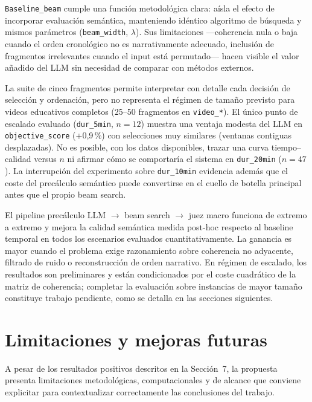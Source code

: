 \documentclass[12pt,a4paper]{article}
\begin{document}
\texttt{Baseline\_beam} cumple una función metodológica clara: aísla el efecto de incorporar evaluación semántica, manteniendo idéntico algoritmo de búsqueda y mismos parámetros (\texttt{beam\_width}, \(\lambda\)). Sus limitaciones ---coherencia nula o baja cuando el orden cronológico no es narrativamente adecuado, inclusión de fragmentos irrelevantes cuando el input está permutado--- hacen visible el valor añadido del LLM sin necesidad de comparar con métodos externos.

La suite de cinco fragmentos permite interpretar con detalle cada decisión de selección y ordenación, pero no representa el régimen de tamaño previsto para videos educativos completos (25--50 fragmentos en \texttt{video\_*}). El único punto de escalado evaluado (\texttt{dur\_5min}, \(n=12\)) muestra una ventaja modesta del LLM en \texttt{objective\_score} (+0{,}9\,\%) con selecciones muy similares (ventanas contiguas desplazadas). No es posible, con los datos disponibles, trazar una curva tiempo--calidad versus \(n\) ni afirmar cómo se comportaría el sistema en \texttt{dur\_20min} (\(n=47\)). La interrupción del experimento sobre \texttt{dur\_10min} evidencia además que el coste del precálculo semántico puede convertirse en el cuello de botella principal antes que el propio beam search.

El pipeline precálculo LLM $\rightarrow$ beam search $\rightarrow$ juez macro funciona de extremo a extremo y mejora la calidad semántica medida post-hoc respecto al baseline temporal en todos los escenarios evaluados cuantitativamente. La ganancia es mayor cuando el problema exige razonamiento sobre coherencia no adyacente, filtrado de ruido o reconstrucción de orden narrativo. En régimen de escalado, los resultados son preliminares y están condicionados por el coste cuadrático de la matriz de coherencia; completar la evaluación sobre instancias de mayor tamaño constituye trabajo pendiente, como se detalla en las secciones siguientes.


\section{Limitaciones y mejoras futuras}

A pesar de los resultados positivos descritos en la Sección~7, la propuesta presenta limitaciones metodológicas, computacionales y de alcance que conviene explicitar para contextualizar correctamente las conclusiones del trabajo.
\end{document}
